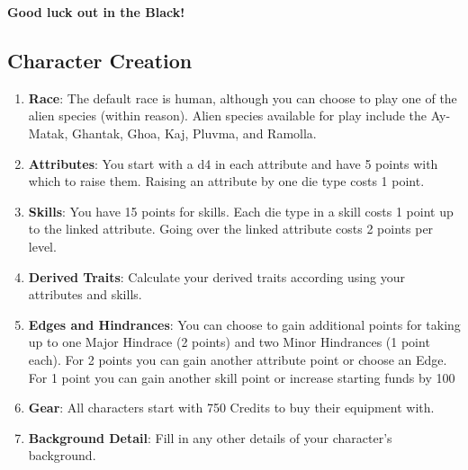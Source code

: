 \documentclass[10pt,twoside]{article}
\begin{document}
\textbf{Good luck out in the Black!}

\newpage

\begin{multicols}{2}

\tableofcontents


\section{Character Creation}

\begin{enumerate}

\item \textbf{Race}: The default race is human, although you can choose to play one of the alien species (within reason). Alien species available for play include the Ay-Matak, Ghantak, Ghoa, Kaj, Pluvma, and Ramolla.

\item \textbf{Attributes}: You start with a d4 in each attribute and have 5 points with which to raise them. Raising an attribute by one die type costs 1 point.

\item \textbf{Skills}: You have 15 points for skills. Each die type in a skill costs 1 point up to the linked attribute. Going over the linked attribute costs 2 points per level.

\item \textbf{Derived Traits}: Calculate your derived traits according using your attributes and skills.

\item \textbf{Edges and Hindrances}: You can choose to gain additional points for taking up to one Major Hindrace (2 points) and two Minor Hindrances (1 point each). For 2 points you can gain another attribute point or choose an Edge. For 1 point you can gain another skill point or increase starting funds by 100%

\item \textbf{Gear}: All characters start with 750 Credits to buy their equipment with.

\item \textbf{Background Detail}: Fill in any other details of your character's background.

\end{enumerate}



\end{multicols}
\end{document}
